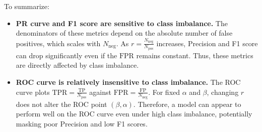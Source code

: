 \bigskip
To summarize:
\vspace{-1em}
\begin{itemize}
    \item \textbf{PR curve and F1 score are sensitive to class imbalance.} The denominators of these metrics depend on the absolute number of false positives, which scales with \(N_{\text{neg}}\). As \(r = \tfrac{N_{\text{neg}}}{N_{\text{pos}}}\) increases, Precision and F1 score can drop significantly even if the \(\text{FPR}\) remains constant. Thus, these metrics are directly affected by class imbalance.
    \item \textbf{ROC curve is relatively insensitive to class imbalance.} The ROC curve plots \(\text{TPR} = \tfrac{\text{TP}}{N_{\text{pos}}}\) against \(\text{FPR} = \tfrac{\text{FP}}{N_{\text{neg}}}\). For fixed \(\alpha\) and \(\beta\), changing \(r\) does not alter the ROC point \((\beta, \alpha)\). Therefore, a model can appear to perform well on the ROC curve even under high class imbalance, potentially masking poor Precision and low F1 scores.
\end{itemize}

\clearpage
